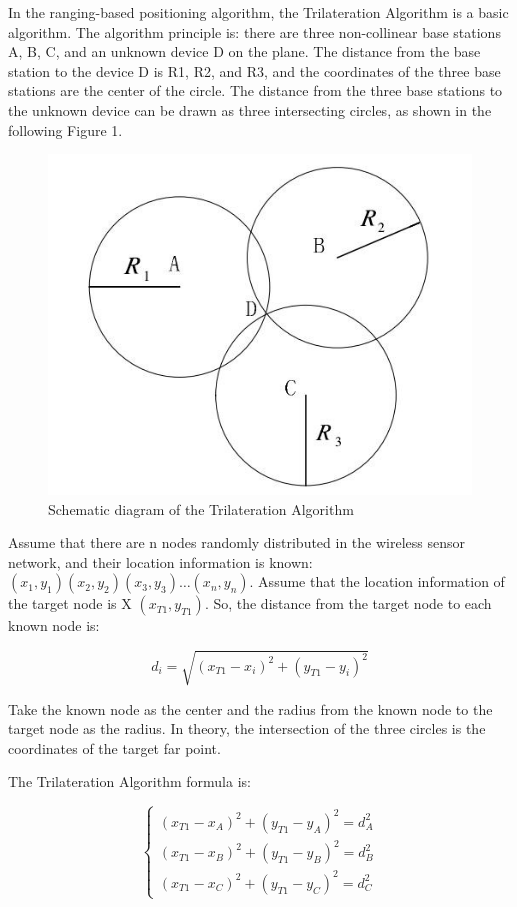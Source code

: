\documentclass{sigchi}
\begin{document}
In the ranging-based positioning algorithm, the Trilateration Algorithm \cite{liu2018trilateration} is a basic algorithm. The algorithm principle is: there are three non-collinear base stations A, B, C, and an unknown device D on the plane. The distance from the base station to the device D is R1, R2, and R3, and the coordinates of the three base stations are the center of the circle. The distance from the three base stations to the unknown device can be drawn as three intersecting circles, as shown in the following Figure 1.
\begin{figure}[h]
\centering
\includegraphics[width=0.7\columnwidth]{1}
\caption{Schematic diagram of the Trilateration Algorithm}
\label{fig:universe}
\end{figure}

Assume that there are n nodes randomly distributed in the wireless sensor network, and their location information is known: $(x_{1}, y_{1})(x_{2}, y_{2})(x_{3}, y_{3}) … (x_{n}, y_{n})$. Assume that the location information of the target node is X $(x_{T1}, y_{T1})$. So, the distance from the target node to each known node is:

\begin{equation*} d_{i}=\sqrt{(x_{T1}-x_{i})^{2}+(y_{T1}-y_{i})^{2}} \tag{1} \end{equation*}

Take the known node as the center and the radius from the known node to the target node as the radius. In theory, the intersection of the three circles is the coordinates of the target far point.

The Trilateration Algorithm formula is:

\begin{equation*} \begin{cases} (x_{T1}-x_{A})^{2}+(y_{T1}-y_{A})^{2}=d_{A}^{2}\\ (x_{T1}-x_{B})^{2}+(y_{T1}-y_{B})^{2}=d_{B}^{2}\\ (x_{T1}-x_{C})^{2}+(y_{T1}-y_{C})^{2}=d_{C}^{2} \end{cases} \tag{2} \end{equation*}
\end{document}
